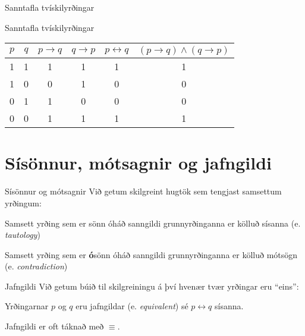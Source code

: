 \documentclass[handout]{beamer}
\begin{document}
\begin{frame}{Sanntafla tvískilyrðingar}
\begin{center}
Sanntafla tvískilyrðingar
\begin{tabular}{cccccc}
\toprule
$p$&$q$&$p \to q$&$q \to p$&$p \leftrightarrow q$&$(p \to q) \land (q \to p)$\\
\midrule
1&1&1&1&1&1\\
1&0&0&1&0&0\\
0&1&1&0&0&0\\
0&0&1&1&1&1\\
\bottomrule
\end{tabular}
\end{center}
\end{frame}

\section{Sísönnur, mótsagnir og jafngildi}

\begin{frame}{Sísönnur og mótsagnir}
Við getum skilgreint hugtök sem tengjast samsettum yrðingum:

\begin{tcolorbox}[title=Sísanna]
Samsett yrðing sem er sönn óháð sanngildi grunnyrðinganna er kölluð sísanna (e. \emph{tautology})
\end{tcolorbox}

\begin{tcolorbox}[title=Mótsögn]
Samsett yrðing sem er \textbf{ó}sönn óháð sanngildi grunnyrðinganna er kölluð mótsögn (e. \emph{contradiction})
\end{tcolorbox}
\end{frame}

\begin{frame}{Jafngildi}
Við getum búið til skilgreiningu á því hvenær tvær yrðingar eru ``eins'':

\begin{tcolorbox}[title=Jafngildi]
Yrðingarnar $p$ og $q$ eru jafngildar (e. \emph{equivalent}) sé $p \leftrightarrow q$ sísanna.
\end{tcolorbox}

Jafngildi er oft táknað með $\equiv$.
\end{frame}
\end{document}
